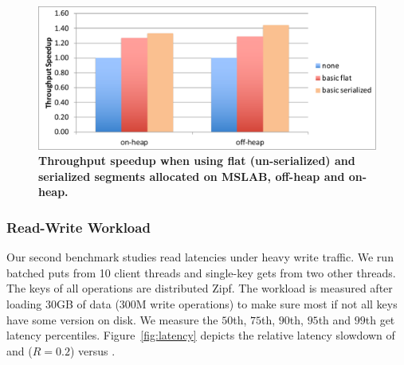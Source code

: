 \begin{figure}[htb]
\includegraphics[width=\figw]{Figs/write-only-off-heap.pdf}
\caption{\textbf{Throughput speedup when using flat (un-serialized) and serialized segments allocated on MSLAB, off-heap and on-heap.
}}
\label{fig:write_only_off_heap}
\end{figure}


\subsubsection{Read-Write Workload}

Our second benchmark studies read latencies under heavy write traffic. 
We run batched puts from 10 client threads and single-key gets from two other threads. 
The keys of all operations are distributed Zipf. The workload is measured after loading 30GB of data (300M write operations) to make sure most if not all keys have some version on disk. We measure the $50$th, 
$75$th, $90$th, $95$th and $99$th get latency percentiles. Figure~\ref{fig:latency} 
depicts the relative latency slowdown of \basic\/ and \adp\/ ($R=0.2$) versus \none.

